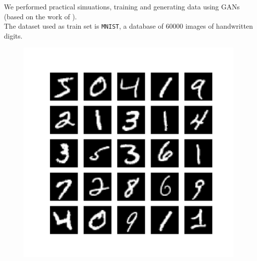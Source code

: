 \documentclass{beamer}
\begin{document}
	\begin{frame}
		We performed practical simuations, training and generating data using GANs (based on the work of \citeauthor{vandegarweb}). \\
		\medskip
		The dataset used as train set is \texttt{MNIST}, a database of $60000$ images of handwritten digits.
		\begin{figure}[H]
			\begin{center}
				\includegraphics[scale = 0.28, trim = {0 3cm 0 3cm},clip]{head_mnist_data.pdf}
			\end{center}
		\end{figure}
	\end{frame}
\end{document}
